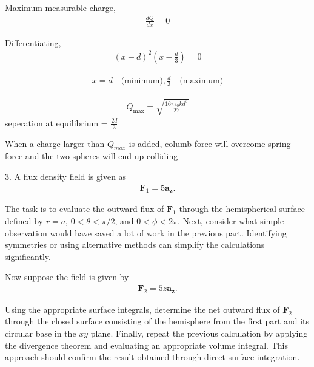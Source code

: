 \documentclass{article}
\begin{document}
Maximum measurable charge,
\begin{align*}
\frac{dQ}{dx} = 0
\end{align*}

Differentiating,
\begin{align*}
(x-d)^2 \left( x - \frac{d}{3} \right) = 0
\end{align*}

\begin{align*}
x = d \quad \text{(minimum)}, \frac{d}{3} \quad \text{(maximum)}
\end{align*}

\begin{align*}
Q_{\text{max}} = \sqrt{\frac{16\pi \epsilon_0 k d^3}{27}}
\end{align*}
seperation at equilibrium = $\frac{2d}{3}$

When a charge larger than $Q_{max}$ is added, columb force will overcome spring force and the two spheres will end up colliding

3. A flux density field is given as
\begin{align*}
\mathbf{F}_1 = 5\mathbf{a_z}.
\end{align*}

The task is to evaluate the outward flux of $\mathbf{F}_1$ through the hemispherical surface defined by $r = a$, $0 < \theta < \pi/2$, and $0 < \phi < 2\pi$. Next, consider what simple observation would have saved a lot of work in the previous part. Identifying symmetries or using alternative methods can simplify the calculations significantly.

Now suppose the field is given by
\begin{align*}
\mathbf{F}_2 = 5z \mathbf{a_z}.
\end{align*}

Using the appropriate surface integrals, determine the net outward flux of $\mathbf{F}_2$ through the closed surface consisting of the hemisphere from the first part and its circular base in the $xy$ plane. Finally, repeat the previous calculation by applying the divergence theorem and evaluating an appropriate volume integral. This approach should confirm the result obtained through direct surface integration.
\end{document}

